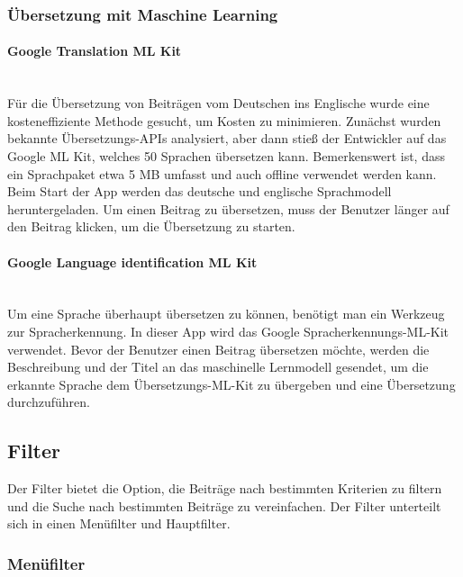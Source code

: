 \subsubsection{Übersetzung mit Maschine Learning}

\paragraph{Google Translation ML Kit}\mbox{} \\

Für die Übersetzung von Beiträgen vom Deutschen ins Englische wurde eine kosteneffiziente Methode gesucht, um Kosten zu minimieren. Zunächst wurden bekannte Übersetzungs-APIs analysiert, aber dann stieß der Entwickler auf das Google ML Kit, welches 50 Sprachen übersetzen kann. Bemerkenswert ist, dass ein Sprachpaket etwa 5 MB umfasst und auch offline verwendet werden kann. Beim Start der App werden das deutsche und englische Sprachmodell heruntergeladen. Um einen Beitrag zu übersetzen, muss der Benutzer länger auf den Beitrag klicken, um die Übersetzung zu starten.



\paragraph{Google Language identification ML Kit}\mbox{} \\

Um eine Sprache überhaupt übersetzen zu können, benötigt man ein Werkzeug zur Spracherkennung. In dieser App wird das Google Spracherkennungs-ML-Kit verwendet. Bevor der Benutzer einen Beitrag übersetzen möchte, werden die Beschreibung und der Titel an das maschinelle Lernmodell gesendet, um die erkannte Sprache dem Übersetzungs-ML-Kit zu übergeben und eine Übersetzung durchzuführen.


\subsection{Filter}
Der Filter bietet die Option, die Beiträge nach bestimmten Kriterien zu filtern und die Suche nach bestimmten Beiträge zu vereinfachen. Der Filter unterteilt sich in einen Menüfilter und Hauptfilter.

\subsubsection{Menüfilter}

